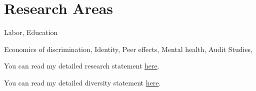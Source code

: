 \documentclass[letterpaper]{article}
\renewenvironment{itemize}{
  \begin{list}{}{
    \setlength{\leftmargin}{1.5em}
  }
}{
  \end{list}
}
\begin{document}
\section*{Research Areas}
\vspace{2 mm}
\begin{itemize}
\item {} Labor, Education
\item {} Economics of discrimination, Identity, Peer effects, Mental health, Audit Studies,
\item You can read my detailed research statement \href{https://hhadah.github.io/statements/Hadah_Research.pdf}{here}.
\item You can read my detailed diversity statement \href{https://hhadah.github.io/statements/Hadah_Diversity.pdf}{here}.
\end{itemize}
\vspace{2 mm}

\end{document}
